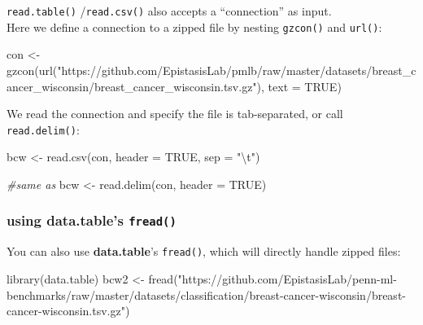 \documentclass[
]{book}
\newenvironment{Shaded}{\begin{snugshade}}{\end{snugshade}}
\newcommand{\AttributeTok}[1]{\textcolor[rgb]{0.77,0.63,0.00}{#1}}
\newcommand{\CommentTok}[1]{\textcolor[rgb]{0.56,0.35,0.01}{\textit{#1}}}
\newcommand{\ConstantTok}[1]{\textcolor[rgb]{0.00,0.00,0.00}{#1}}
\newcommand{\FunctionTok}[1]{\textcolor[rgb]{0.00,0.00,0.00}{#1}}
\newcommand{\NormalTok}[1]{#1}
\newcommand{\OtherTok}[1]{\textcolor[rgb]{0.56,0.35,0.01}{#1}}
\newcommand{\SpecialCharTok}[1]{\textcolor[rgb]{0.00,0.00,0.00}{#1}}
\newcommand{\StringTok}[1]{\textcolor[rgb]{0.31,0.60,0.02}{#1}}
\begin{document}
\texttt{read.table()} /\texttt{read.csv()} also accepts a ``connection'' as input.\\
Here we define a connection to a zipped file by nesting \texttt{gzcon()} and \texttt{url()}:

\begin{Shaded}
\begin{Highlighting}[]
\NormalTok{con }\OtherTok{\textless{}{-}} \FunctionTok{gzcon}\NormalTok{(}\FunctionTok{url}\NormalTok{(}\StringTok{"https://github.com/EpistasisLab/pmlb/raw/master/datasets/breast\_cancer\_wisconsin/breast\_cancer\_wisconsin.tsv.gz"}\NormalTok{),}
             \AttributeTok{text =} \ConstantTok{TRUE}\NormalTok{)}
\end{Highlighting}
\end{Shaded}

We read the connection and specify the file is tab-separated, or call \texttt{read.delim()}:

\begin{Shaded}
\begin{Highlighting}[]
\NormalTok{bcw }\OtherTok{\textless{}{-}} \FunctionTok{read.csv}\NormalTok{(con, }\AttributeTok{header =} \ConstantTok{TRUE}\NormalTok{, }\AttributeTok{sep =} \StringTok{"}\SpecialCharTok{\textbackslash{}t}\StringTok{"}\NormalTok{)}

\CommentTok{\#same as}
\NormalTok{bcw }\OtherTok{\textless{}{-}} \FunctionTok{read.delim}\NormalTok{(con, }\AttributeTok{header =} \ConstantTok{TRUE}\NormalTok{)}
\end{Highlighting}
\end{Shaded}

\hypertarget{using-data.tables-fread}{%
\subsubsection{\texorpdfstring{using \textbf{data.table}'s \texttt{fread()}}{using data.table's fread()}}\label{using-data.tables-fread}}

You can also use \textbf{data.table}'s \texttt{fread()}, which will directly handle zipped files:

\begin{Shaded}
\begin{Highlighting}[]
\FunctionTok{library}\NormalTok{(data.table)}
\NormalTok{bcw2 }\OtherTok{\textless{}{-}} \FunctionTok{fread}\NormalTok{(}\StringTok{"https://github.com/EpistasisLab/penn{-}ml{-}benchmarks/raw/master/datasets/classification/breast{-}cancer{-}wisconsin/breast{-}cancer{-}wisconsin.tsv.gz"}\NormalTok{)}
\end{Highlighting}
\end{Shaded}
\end{document}
